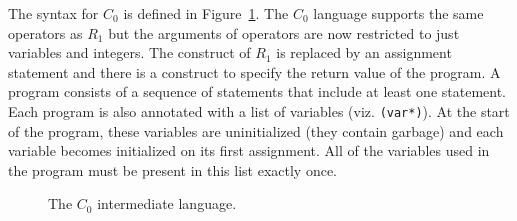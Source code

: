 \documentclass[11pt]{book}
\begin{document}
The syntax for $C_0$ is defined in Figure~\ref{fig:c0-syntax}.  The
$C_0$ language supports the same operators as $R_1$ but the arguments
of operators are now restricted to just variables and integers. The
 construct of $R_1$ is replaced by an assignment statement
and there is a  construct to specify the return value of
the program. A program consists of a sequence of statements that
include at least one  statement. Each program is also
annotated with a list of variables (viz. {\tt (var*)}). At the start
of the program, these variables are uninitialized (they contain garbage)
and each variable becomes initialized on its first assignment. All of
the variables used in the program must be present in this list exactly once.

\begin{figure}[tp]
\caption{The $C_0$ intermediate language.}
\label{fig:c0-syntax}
\end{figure}
\end{document}
